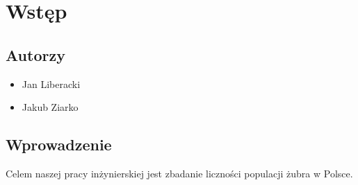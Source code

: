 \section{Wstęp}
 
\subsection{Autorzy}
\begin{itemize}
\item Jan Liberacki
\item Jakub Ziarko
\end{itemize}

\subsection{Wprowadzenie}
Celem naszej pracy inżynierskiej jest zbadanie liczności populacji żubra w Polsce.